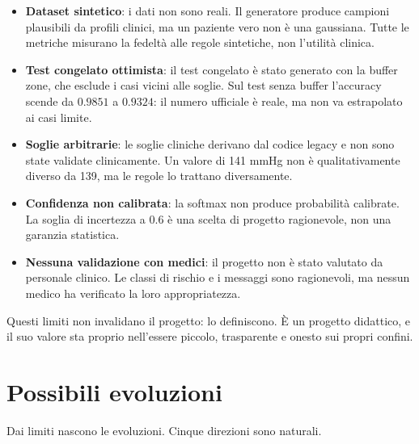 \begin{itemize}
  \item \textbf{Dataset sintetico}: i dati non sono reali. Il generatore
        produce campioni plausibili da profili clinici, ma un paziente vero
        non è una gaussiana. Tutte le metriche misurano la fedeltà alle
        regole sintetiche, non l'utilità clinica.
  \item \textbf{Test congelato ottimista}: il test congelato è stato
        generato con la buffer zone, che esclude i casi vicini alle soglie.
        Sul test senza buffer l'accuracy scende da $0.9851$ a $0.9324$:
        il numero ufficiale è reale, ma non va estrapolato ai casi limite.
  \item \textbf{Soglie arbitrarie}: le soglie cliniche derivano dal codice
        legacy e non sono state validate clinicamente. Un valore di 141
        mmHg non è qualitativamente diverso da 139, ma le regole lo
        trattano diversamente.
  \item \textbf{Confidenza non calibrata}: la softmax non produce
        probabilità calibrate. La soglia di incertezza a 0.6 è una scelta
        di progetto ragionevole, non una garanzia statistica.
  \item \textbf{Nessuna validazione con medici}: il progetto non è stato
        valutato da personale clinico. Le classi di rischio e i messaggi
        sono ragionevoli, ma nessun medico ha verificato la loro
        appropriatezza.
\end{itemize}

Questi limiti non invalidano il progetto: lo definiscono. È un progetto
didattico, e il suo valore sta proprio nell'essere piccolo, trasparente e
onesto sui propri confini.

\section{Possibili evoluzioni}\label{sec:evoluzioni}

Dai limiti nascono le evoluzioni. Cinque direzioni sono naturali.

